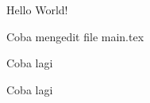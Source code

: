 \documentclass{article}
\begin{document}
  
  Hello World!
  
  Coba mengedit file main.tex  
  
  Coba lagi
  
  Coba lagi
\end{document}
